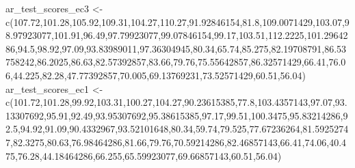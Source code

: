 \documentclass[
]{book}
\newenvironment{Shaded}{\begin{snugshade}}{\end{snugshade}}
\newcommand{\FloatTok}[1]{\textcolor[rgb]{0.00,0.00,0.81}{#1}}
\newcommand{\FunctionTok}[1]{\textcolor[rgb]{0.00,0.00,0.00}{#1}}
\newcommand{\NormalTok}[1]{#1}
\newcommand{\OtherTok}[1]{\textcolor[rgb]{0.56,0.35,0.01}{#1}}
\begin{document}
\begin{Shaded}
\begin{Highlighting}[]
\NormalTok{ar\_test\_scores\_ec3 }\OtherTok{\textless{}{-}} \FunctionTok{c}\NormalTok{(}\FloatTok{107.72}\NormalTok{,}\FloatTok{101.28}\NormalTok{,}\FloatTok{105.92}\NormalTok{,}\FloatTok{109.31}\NormalTok{,}\FloatTok{104.27}\NormalTok{,}\FloatTok{110.27}\NormalTok{,}\FloatTok{91.92846154}\NormalTok{,}\FloatTok{81.8}\NormalTok{,}\FloatTok{109.0071429}\NormalTok{,}\FloatTok{103.07}\NormalTok{,}\FloatTok{98.97923077}\NormalTok{,}\FloatTok{101.91}\NormalTok{,}\FloatTok{96.49}\NormalTok{,}\FloatTok{97.79923077}\NormalTok{,}\FloatTok{99.07846154}\NormalTok{,}\FloatTok{99.17}\NormalTok{,}\FloatTok{103.51}\NormalTok{,}\FloatTok{112.2225}\NormalTok{,}\FloatTok{101.2964286}\NormalTok{,}\FloatTok{94.5}\NormalTok{,}\FloatTok{98.92}\NormalTok{,}\FloatTok{97.09}\NormalTok{,}\FloatTok{93.83989011}\NormalTok{,}\FloatTok{97.36304945}\NormalTok{,}\FloatTok{80.34}\NormalTok{,}\FloatTok{65.74}\NormalTok{,}\FloatTok{85.275}\NormalTok{,}\FloatTok{82.19708791}\NormalTok{,}\FloatTok{86.53758242}\NormalTok{,}\FloatTok{86.2025}\NormalTok{,}\FloatTok{86.63}\NormalTok{,}\FloatTok{82.57392857}\NormalTok{,}\FloatTok{83.66}\NormalTok{,}\FloatTok{79.76}\NormalTok{,}\FloatTok{75.55642857}\NormalTok{,}\FloatTok{86.32571429}\NormalTok{,}\FloatTok{66.41}\NormalTok{,}\FloatTok{76.06}\NormalTok{,}\FloatTok{44.225}\NormalTok{,}\FloatTok{82.28}\NormalTok{,}\FloatTok{47.77392857}\NormalTok{,}\FloatTok{70.005}\NormalTok{,}\FloatTok{69.13769231}\NormalTok{,}\FloatTok{73.52571429}\NormalTok{,}\FloatTok{60.51}\NormalTok{,}\FloatTok{56.04}\NormalTok{)}
\NormalTok{ar\_test\_scores\_ec1 }\OtherTok{\textless{}{-}} \FunctionTok{c}\NormalTok{(}\FloatTok{101.72}\NormalTok{,}\FloatTok{101.28}\NormalTok{,}\FloatTok{99.92}\NormalTok{,}\FloatTok{103.31}\NormalTok{,}\FloatTok{100.27}\NormalTok{,}\FloatTok{104.27}\NormalTok{,}\FloatTok{90.23615385}\NormalTok{,}\FloatTok{77.8}\NormalTok{,}\FloatTok{103.4357143}\NormalTok{,}\FloatTok{97.07}\NormalTok{,}\FloatTok{93.13307692}\NormalTok{,}\FloatTok{95.91}\NormalTok{,}\FloatTok{92.49}\NormalTok{,}\FloatTok{93.95307692}\NormalTok{,}\FloatTok{95.38615385}\NormalTok{,}\FloatTok{97.17}\NormalTok{,}\FloatTok{99.51}\NormalTok{,}\FloatTok{100.3475}\NormalTok{,}\FloatTok{95.83214286}\NormalTok{,}\FloatTok{92.5}\NormalTok{,}\FloatTok{94.92}\NormalTok{,}\FloatTok{91.09}\NormalTok{,}\FloatTok{90.4332967}\NormalTok{,}\FloatTok{93.52101648}\NormalTok{,}\FloatTok{80.34}\NormalTok{,}\FloatTok{59.74}\NormalTok{,}\FloatTok{79.525}\NormalTok{,}\FloatTok{77.67236264}\NormalTok{,}\FloatTok{81.59252747}\NormalTok{,}\FloatTok{82.3275}\NormalTok{,}\FloatTok{80.63}\NormalTok{,}\FloatTok{76.98464286}\NormalTok{,}\FloatTok{81.66}\NormalTok{,}\FloatTok{79.76}\NormalTok{,}\FloatTok{70.59214286}\NormalTok{,}\FloatTok{82.46857143}\NormalTok{,}\FloatTok{66.41}\NormalTok{,}\FloatTok{74.06}\NormalTok{,}\FloatTok{40.475}\NormalTok{,}\FloatTok{76.28}\NormalTok{,}\FloatTok{44.18464286}\NormalTok{,}\FloatTok{66.255}\NormalTok{,}\FloatTok{65.59923077}\NormalTok{,}\FloatTok{69.66857143}\NormalTok{,}\FloatTok{60.51}\NormalTok{,}\FloatTok{56.04}\NormalTok{)}

\end{Highlighting}
\end{Shaded}
\end{document}
